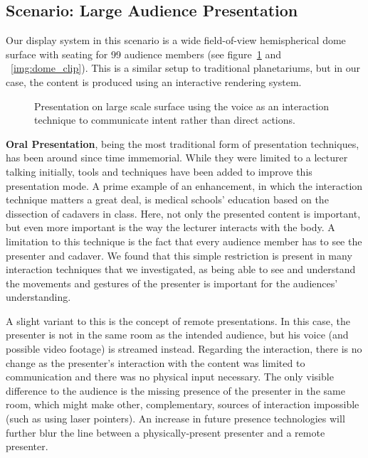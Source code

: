 \documentclass[review,journal]{vgtc}         %
\begin{document}
\subsection{Scenario: Large Audience Presentation} \label{sec:largeaudience}
Our display system in this scenario is a wide field-of-view hemispherical dome surface with seating for 99 audience members (see figure~\ref{img:dome_presentation} and ~\ref{img:dome_clip}).
This is a similar setup to traditional planetariums, but in our case, the content is produced using an interactive rendering system.

\begin{figure}[htb]
	\centering
	\caption{Presentation on large scale surface using the voice as an interaction technique to communicate intent rather than direct actions.}
	\label{img:dome_presentation}
\end{figure}

\noindent \textbf{Oral Presentation}, being the most traditional form of presentation techniques, has been around since time immemorial.
While they were limited to a lecturer talking initially, tools and techniques have been added to improve this presentation mode.
A prime example of an enhancement, in which the interaction technique matters a great deal, is medical schools' education based on the dissection of cadavers in class.
Here, not only the presented content is important, but even more important is the way the lecturer interacts with the body.
A limitation to this technique is the fact that every audience member has to see the presenter and cadaver.
We found that this simple restriction is present in many interaction techniques that we investigated, as being able to see and understand the movements and gestures of the presenter is important for the audiences' understanding.

A slight variant to this is the concept of remote presentations.
In this case, the presenter is not in the same room as the intended audience, but his voice (and possible video footage) is streamed instead.
Regarding the interaction, there is no change as the presenter's interaction with the content was limited to communication and there was no physical input necessary.
The only visible difference to the audience is the missing presence of the presenter in the same room, which might make other, complementary, sources of interaction impossible (such as using laser pointers).
An increase in future presence technologies will further blur the line between a physically-present presenter and a remote presenter.
\end{document}

